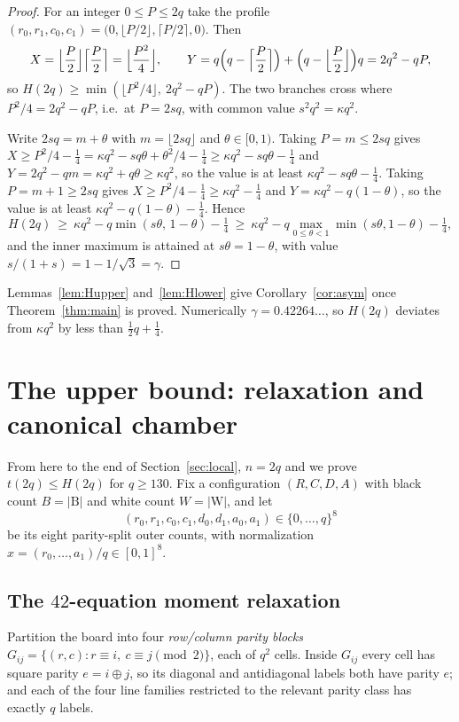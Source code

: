 \documentclass[11pt]{amsart}
\theoremstyle{definition}
\theoremstyle{remark}
\newcommand{\Bl}{\mathrm{B}}
\newcommand{\Wh}{\mathrm{W}}
\begin{document}
\begin{proof}
For an integer $0\le P\le2q$ take the profile $(r_0,r_1,c_0,c_1)=\bigl(0,\lfloor P/2\rfloor,\lceil P/2\rceil,0\bigr)$. Then
\[
X=\Bigl\lfloor\frac{P}{2}\Bigr\rfloor\Bigl\lceil\frac{P}{2}\Bigr\rceil=\Bigl\lfloor\frac{P^2}{4}\Bigr\rfloor,
\qquad
Y=q\Bigl(q-\Bigl\lceil\frac P2\Bigr\rceil\Bigr)+\Bigl(q-\Bigl\lfloor\frac P2\Bigr\rfloor\Bigr)q=2q^2-qP,
\]
so $H(2q)\ge\min(\lfloor P^2/4\rfloor,\ 2q^2-qP)$. The two branches cross where $P^2/4=2q^2-qP$, i.e.\ at $P=2sq$, with common value $s^2q^2=\kappa q^2$.

Write $2sq=m+\theta$ with $m=\lfloor2sq\rfloor$ and $\theta\in[0,1)$. Taking $P=m\le2sq$ gives $X\ge P^2/4-\frac14=\kappa q^2-sq\theta+\theta^2/4-\frac14\ge\kappa q^2-sq\theta-\frac14$ and $Y=2q^2-qm=\kappa q^2+q\theta\ge\kappa q^2$, so the value is at least $\kappa q^2-sq\theta-\frac14$. Taking $P=m+1\ge2sq$ gives $X\ge P^2/4-\frac14\ge\kappa q^2-\frac14$ and $Y=\kappa q^2-q(1-\theta)$, so the value is at least $\kappa q^2-q(1-\theta)-\frac14$. Hence
\[
H(2q)\ \ge\ \kappa q^2-q\min(s\theta,\,1-\theta)-\tfrac14\ \ge\ \kappa q^2-q\max_{0\le\theta<1}\min(s\theta,1-\theta)-\tfrac14 ,
\]
and the inner maximum is attained at $s\theta=1-\theta$, with value $s/(1+s)=1-1/\sqrt3=\gamma$.
\end{proof}

Lemmas~\ref{lem:Hupper} and~\ref{lem:Hlower} give Corollary~\ref{cor:asym} once Theorem~\ref{thm:main} is proved. Numerically $\gamma=0.42264\ldots$, so $H(2q)$ deviates from $\kappa q^2$ by less than $\tfrac12 q+\tfrac14$.

\section{The upper bound: relaxation and canonical chamber}\label{sec:relax}

From here to the end of Section~\ref{sec:local}, $n=2q$ and we prove $t(2q)\le H(2q)$ for $q\ge130$. Fix a configuration $(R,C,D,A)$ with black count $B=|\Bl|$ and white count $W=|\Wh|$, and let
\[
(r_0,r_1,c_0,c_1,d_0,d_1,a_0,a_1)\in\{0,\dots,q\}^8
\]
be its eight parity-split outer counts, with normalization $x=(r_0,\dots,a_1)/q\in[0,1]^8$.

\subsection{The \texorpdfstring{$42$}{42}-equation moment relaxation}

Partition the board into four \emph{row/column parity blocks} $G_{ij}=\{(r,c):r\equiv i,\ c\equiv j\pmod2\}$, each of $q^2$ cells. Inside $G_{ij}$ every cell has square parity $e=i\oplus j$, so its diagonal and antidiagonal labels both have parity $e$; and each of the four line families restricted to the relevant parity class has exactly $q$ labels.
\end{document}
